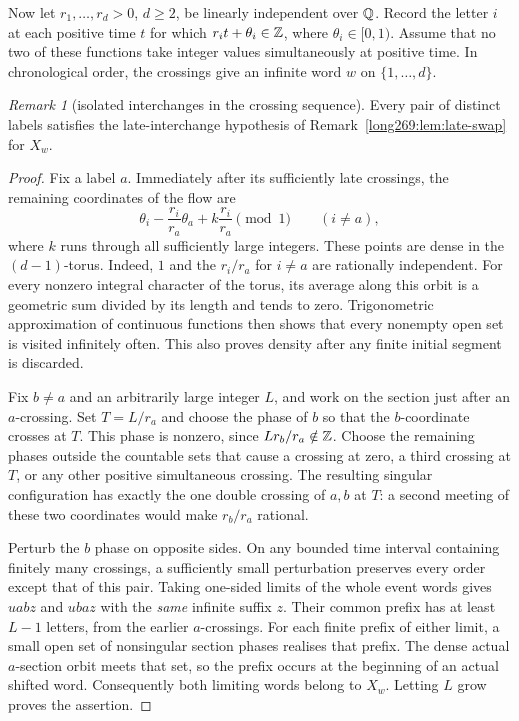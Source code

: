 \documentclass[11pt]{article}
\theoremstyle{remark}
\newtheorem{recordremark}[theorem]{Remark}
\renewenvironment{remark}[1][]{\begin{recordremark}[#1]}{\end{recordremark}}
\theoremstyle{plain}
\begin{document}
Now let $r_1,\ldots,r_d>0$, $d\ge2$, be linearly independent over $\mathbb{Q}$.
Record the letter $i$ at each positive time $t$ for which
$r_it+\theta_i\in\mathbb{Z}$, where $\theta_i\in[0,1)$. Assume that no two of
these functions take integer values simultaneously at positive time.
In chronological order, the crossings give an infinite word $w$ on
$\{1,\ldots,d\}$.

\begin{remark}[isolated interchanges in the crossing sequence]
\label{long269:lem:clock-swaps}
Every pair of distinct labels satisfies the late-interchange
hypothesis of Remark~\ref{long269:lem:late-swap} for $X_w$.
\end{remark}

\begin{proof}
Fix a label $a$.  Immediately after its sufficiently late crossings,
the remaining coordinates of the flow are
\[
 \theta_i-\frac{r_i}{r_a}\theta_a
       +k\frac{r_i}{r_a}\pmod1\qquad(i\ne a),
\]
where $k$ runs through all sufficiently large integers.  These points
are dense in the $(d-1)$-torus.  Indeed, $1$ and the $r_i/r_a$ for $i\ne a$
are rationally independent.  For every nonzero integral character of
the torus, its average along this orbit is a geometric sum divided by
its length and tends to zero.  Trigonometric approximation of continuous
functions then shows that every nonempty open set is visited infinitely
often.  This also proves density after any finite initial segment is
discarded.

Fix $b\ne a$ and an arbitrarily large integer $L$, and work on the section
just after an $a$-crossing.  Set $T=L/r_a$ and choose the phase of $b$ so
that the $b$-coordinate crosses at $T$.  This phase is nonzero, since
$Lr_b/r_a\notin\mathbb{Z}$.  Choose the remaining phases outside the countable
sets that cause a crossing at zero, a third crossing at $T$, or any other
positive simultaneous crossing.  The resulting singular configuration has
exactly the one double crossing of $a,b$ at $T$: a second meeting of these
two coordinates would make $r_b/r_a$ rational.

Perturb the $b$ phase on opposite sides.  On any bounded time interval
containing finitely many crossings, a sufficiently small perturbation
preserves every order except that of this pair.  Taking one-sided limits
of the whole event words gives $uabz$ and $ubaz$ with the \emph{same}
infinite suffix $z$.  Their common prefix has at least $L-1$ letters,
from the earlier $a$-crossings.  For each finite prefix of either limit,
a small open set of nonsingular section phases realises that prefix.
The dense actual $a$-section orbit meets that set, so the prefix occurs
at the beginning of an actual shifted word.  Consequently both limiting
words belong to $X_w$.  Letting $L$ grow proves the assertion.
\end{proof}
\end{document}
